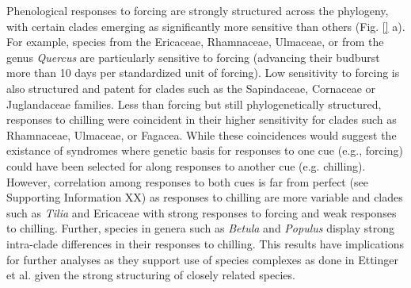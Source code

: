 \documentclass{article}\usepackage[]{graphicx}\usepackage[]{color}
\begin{document}
Phenological responses to forcing are strongly structured across the phylogeny, with certain clades emerging as significantly more sensitive than others (Fig. \ref{} a). For example, species from the Ericaceae, Rhamnaceae, Ulmaceae, or from the genus \emph{Quercus} are particularly sensitive to forcing (advancing their budburst more than 10 days per standardized unit of forcing). Low sensitivity to forcing is also structured and patent for clades such as the Sapindaceae, Cornaceae or Juglandaceae families. Less than forcing but still phylogenetically structured, responses to chilling were coincident in their higher sensitivity for clades such as Rhamnaceae, Ulmaceae, or Fagacea. While these coincidences would suggest the existance of syndromes where genetic basis for responses to one cue (e.g., forcing) could have been selected for along responses to another cue (e.g. chilling). However, correlation among responses to both cues is far from perfect (see Supporting Information XX) as responses to chilling are more variable and clades such as \emph{Tilia} and Ericaceae with strong responses to forcing and weak responses to chilling. Further, species in genera such as \emph{Betula} and \emph{Populus} display strong intra-clade differences in their responses to chilling. This results have implications for further analyses as they support use of species complexes as done in Ettinger et al. given the strong structuring of closely related species.\\ %
\end{document}
